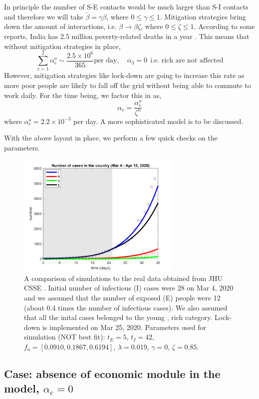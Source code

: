 \documentclass{article}
\begin{document}
In principle the number of S-E contacts would be much larger than S-I contacts and therefore we will take $\tilde{\beta} = \gamma \beta$, where $0 \leq \gamma \leq 1$. Mitigation strategies bring down the amount of interactions, i.e. $\beta \to \beta \zeta$, where $0 \leq \zeta \leq 1$. According to some reports, India has 2.5 million poverty-related deaths in a year \cite{}. This means that without mitigation strategies in place, \[ \sum_{e=1}^{2} \alpha_e^o \sim \frac{2.5 \times 10^6}{365} \text{per day}, \quad \alpha_3 = 0 \:\: \text{i.e. rich are not affected} \] However, mitigation strategies like lock-down are going to increase this rate as more poor people are likely to fall off the grid without being able to commute to work daily. For the time being, we factor this in as, \[ \alpha_e = \frac{\alpha^o_e}{\zeta^n} \] where $\alpha_e^o = 2.2 \times 10^{-3}$ per day.
A more sophisticated model is to be discussed.

With the above layout in place, we perform a few quick checks on the parameters. 
\begin{figure}[H]
	\centering
	\includegraphics[width=0.7\textwidth]{model_data_comparison}
	\caption{A comparison of simulations to the real data obtained from JHU CSSE \cite{JHUdata}. Initial number of infectious (I) cases were 28 on Mar 4, 2020 and we assumed that the number of exposed (E) people were 12 (about 0.4 times the number of infectious cases). We also assumed that all the inital cases belonged to the young , rich category. Lock-down is implemented on Mar 25, 2020. Parameters used for simulation (NOT best fit): $t_E = 5$, $t_I = 42$, $ f_a = [0.0910, 0.1867, 0.6194] $, $\lambda = 0.019$, $\gamma = 0$, $\zeta = 0.85$.  }
\end{figure}

\pagebreak
\subsection{Case: absence of economic module in the model, $\alpha_e = 0$}
\end{document}

